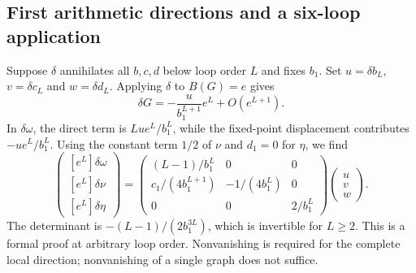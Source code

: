 \documentclass[11pt,a4paper,oneside]{article}
\theoremstyle{plain}
\theoremstyle{definition}
\theoremstyle{remark}
\numberwithin{equation}{section}
\begin{document}
\subsection{First arithmetic directions and a six-loop application}\label{sec:rg:7}
Suppose $\delta$ annihilates all $b,c,d$ below loop order $L$ and fixes $b_1$. Set $u=\delta b_L$, $v=\delta c_L$ and $w=\delta d_L$. Applying $\delta$ to $B(G)=e$ gives
\begin{equation}
\delta G=-\frac{u}{b_1^{L+1}}e^L+O(e^{L+1}).
\end{equation}
In $\delta\omega$, the direct term is $Lu e^L/b_1^L$, while the fixed-point displacement contributes $-u e^L/b_1^L$. Using the constant term $1/2$ of $\nu$ and $d_1=0$ for $\eta$, we find
\begin{equation}
\begin{pmatrix}[e^L]\delta\omega\\{}[e^L]\delta\nu\\{}[e^L]\delta\eta\end{pmatrix}
 =
 \begin{pmatrix}
 (L-1)/b_1^L&0&0\\
 c_1/(4b_1^{L+1})&-1/(4b_1^L)&0\\
 0&0&2/b_1^L
 \end{pmatrix}
 \begin{pmatrix}u\\v\\w\end{pmatrix}.               \label{eq:rg:20}
\end{equation}
The determinant is $-(L-1)/(2b_1^{3L})$, which is invertible for $L\geq2$. This is a formal proof at arbitrary loop order. Nonvanishing is required for the complete local direction; nonvanishing of a single graph does not suffice.
\end{document}
